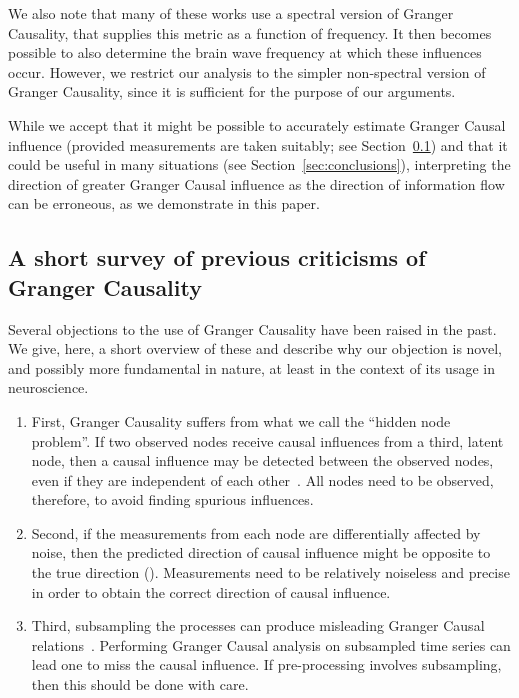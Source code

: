 \documentclass[letterpaper, 10pt, conference]{ieeeconf}
\begin{document}
We also note that many of these works use a spectral version of Granger Causality, that supplies this metric as a function of frequency. It then becomes possible to also determine the brain wave frequency at which these influences occur. However, we restrict our analysis to the simpler non-spectral version of Granger Causality, since it is sufficient for the purpose of our arguments.

While we accept that it might be possible to accurately estimate Granger Causal influence (provided measurements are taken suitably; see Section~\ref{sec:previous-criticisms-of-gc}) and that it could be useful in many situations (see Section~\ref{sec:conclusions}), interpreting the direction of greater Granger Causal influence as the direction of information flow can be erroneous, as we demonstrate in this paper.


\subsection{A short survey of previous criticisms of Granger Causality}
\label{sec:previous-criticisms-of-gc}

Several objections to the use of Granger Causality have been raised in the past. We give, here, a short overview of these and describe why our objection is novel, and possibly more fundamental in nature, at least in the context of its usage in neuroscience.

\begin{enumerate}
	\item First, Granger Causality suffers from what we call the ``hidden node problem''. If two observed nodes receive causal influences from a third, latent node, then a causal influence may be detected between the observed nodes, even if they are independent of each other~\cite{pearl2009causality-hidden-node}. All nodes need to be observed, therefore, to avoid finding spurious influences.
	\item Second, if the measurements from each node are differentially affected by noise, then the predicted direction of causal influence might be opposite to the true direction (\cite{nalatore2007mitigating, andersson2005testing}). Measurements need to be relatively noiseless and precise in order to obtain the correct direction of causal influence.
	\item Third, subsampling the processes can produce misleading Granger Causal relations~\cite{gong2015discovering}. Performing Granger Causal analysis on subsampled time series can lead one to miss the causal influence. If pre-processing involves subsampling, then this should be done with care.
\end{enumerate}
\end{document}
